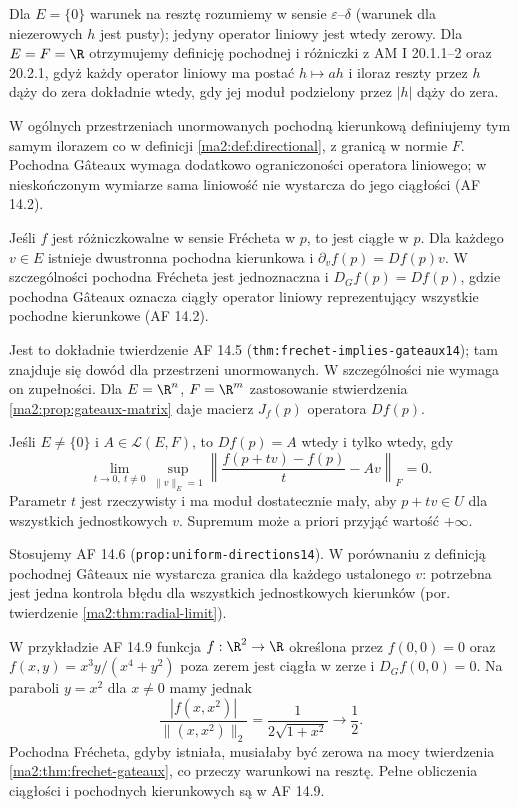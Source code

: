 Dla $E=\{0\}$ warunek na resztę rozumiemy w sensie
$\varepsilon$--$\delta$ (warunek dla niezerowych $h$ jest pusty); jedyny operator
liniowy jest wtedy zerowy.
Dla $E=F=\R$ otrzymujemy definicję pochodnej i różniczki
z AM I 20.1.1--2 oraz 20.2.1, gdyż każdy operator liniowy ma
postać $h\mapsto ah$ i iloraz reszty przez $h$ dąży
do zera dokładnie wtedy, gdy jej moduł podzielony
przez $|h|$ dąży do zera.

W ogólnych przestrzeniach unormowanych pochodną
kierunkową definiujemy tym samym ilorazem co w definicji
\ref{ma2:def:directional}, z granicą w normie $F$.
Pochodna Gâteaux wymaga dodatkowo ograniczoności
operatora liniowego; w nieskończonym wymiarze sama
liniowość nie wystarcza do jego ciągłości (AF 14.2).

\begin{twierdzenie}
\label{ma2:thm:frechet-gateaux}
Jeśli $f$ jest różniczkowalne w sensie Frécheta w $p$,
to jest ciągłe w $p$. Dla każdego $v\in E$ istnieje
dwustronna pochodna kierunkowa i
$\partial_v f(p)=Df(p)v$.
W szczególności pochodna Frécheta jest jednoznaczna
i $D_Gf(p)=Df(p)$, gdzie pochodna Gâteaux oznacza
ciągły operator liniowy reprezentujący wszystkie
pochodne kierunkowe (AF 14.2).
\end{twierdzenie}

Jest to dokładnie twierdzenie AF 14.5
(\texttt{thm:frechet-implies-gateaux14}); tam znajduje
się dowód dla przestrzeni unormowanych. W szczególności
nie wymaga on zupełności. Dla $E=\R^n$, $F=\R^m$
zastosowanie stwierdzenia \ref{ma2:prop:gateaux-matrix}
daje macierz $J_f(p)$ operatora $Df(p)$.

\begin{stwierdzenie}
\label{ma2:prop:frechet-uniform}
Jeśli $E\ne\{0\}$ i $A\in\mathcal L(E,F)$, to
$Df(p)=A$ wtedy i tylko wtedy, gdy
\[
 \lim_{t\to0,\ t\ne0}
 \sup_{\|v\|_E=1}
 \left\|\frac{f(p+tv)-f(p)}{t}-Av\right\|_F=0.
\]
Parametr $t$ jest rzeczywisty i ma moduł dostatecznie
mały, aby $p+tv\in U$ dla wszystkich jednostkowych $v$.
Supremum może a priori przyjąć wartość $+\infty$.
\end{stwierdzenie}

Stosujemy AF 14.6 (\texttt{prop:uniform-directions14}).
W porównaniu z definicją pochodnej Gâteaux nie wystarcza
granica dla każdego ustalonego $v$: potrzebna jest
jedna kontrola błędu dla wszystkich jednostkowych
kierunków (por. twierdzenie \ref{ma2:thm:radial-limit}).

\begin{przyklad}
\label{ma2:ex:frechet-counterexample}
W przykładzie AF 14.9 funkcja $f:\R^2\to\R$ określona
przez $f(0,0)=0$ oraz
$f(x,y)=x^3y/(x^4+y^2)$ poza zerem jest ciągła w zerze
i $D_Gf(0,0)=0$. Na paraboli $y=x^2$ dla $x\ne0$ mamy jednak
\[
 \frac{|f(x,x^2)|}{\|(x,x^2)\|_2}
 =\frac{1}{2\sqrt{1+x^2}}\longrightarrow\frac12.
\]
Pochodna Frécheta, gdyby istniała, musiałaby być zerowa
na mocy twierdzenia \ref{ma2:thm:frechet-gateaux},
co przeczy warunkowi na resztę. Pełne obliczenia
ciągłości i pochodnych kierunkowych są w AF 14.9.
\end{przyklad}

